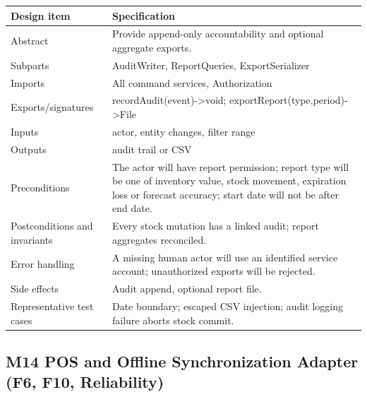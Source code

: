 {\def\LTcaptype{none} %
\begin{longtable}[]{|
  >{\raggedright\arraybackslash}m{}|
  >{\raggedright\arraybackslash}m{}|}
\hline
\begin{minipage}[c]{\linewidth}\raggedright
\textbf{Design item}
\end{minipage} & \begin{minipage}[c]{\linewidth}\raggedright
\textbf{Specification}
\end{minipage} \\
\hline
\endhead

\endlastfoot
Abstract & Provide append-only accountability and optional aggregate exports. \\ \hline
Subparts & AuditWriter, ReportQueries, ExportSerializer \\ \hline
Imports & All command services, Authorization \\ \hline
Exports/signatures & recordAudit(event)-\textgreater void; exportReport(type,period)-\textgreater File \\ \hline
Inputs & actor, entity changes, filter range \\ \hline
Outputs & audit trail or CSV \\ \hline
Preconditions & The actor will have report permission; report type will be one of inventory value, stock movement, expiration loss or forecast accuracy; start date will not be after end date. \\ \hline
Postconditions and invariants & Every stock mutation has a linked audit; report aggregates reconciled. \\ \hline
Error handling & A missing human actor will use an identified service account; unauthorized exports will be rejected. \\ \hline
Side effects & Audit append, optional report file. \\ \hline
Representative test cases & Date boundary; escaped CSV injection; audit logging failure aborts stock commit. \\ \hline
\end{longtable}
}

\subsection{M14 POS and Offline Synchronization Adapter (F6, F10, Reliability)}\label{m14-pos-integration-adapter-f6-f10}

